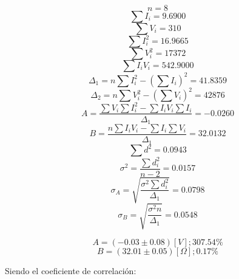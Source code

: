\documentclass[letter,11pt]{article}
\begin{document}
\begin{equation*}
    n = 8
\end{equation*}
\begin{equation*}
    \sum I_i = 9.6900
\end{equation*}
\begin{equation*}
    \sum V_i = 310
\end{equation*}
\begin{equation*}
    \sum I^2_i = 16.9665
\end{equation*}
\begin{equation*}
    \sum V^2_i = 17372
\end{equation*}
\begin{equation*}
    \sum I_i V_i = 542.9000
\end{equation*}
\begin{equation*}
    \Delta_1 = n \sum I^2_i - \left( \sum I_i \right)^2 = 41.8359
\end{equation*}
\begin{equation*}
    \Delta_2 = n \sum V^2_i - \left( \sum V_i \right)^2 = 42876
\end{equation*}
\begin{equation*}
    A = \frac{\sum V_i \sum I^2_i - \sum I_i V_i \sum I_i}{\Delta_1} = -0.0260
\end{equation*}
\begin{equation*}
    B = \frac{n \sum I_i V_i - \sum I_i \sum V_i}{\Delta_1} = 32.0132
\end{equation*}
\begin{equation*}
    \sum d^2 = 0.0943
\end{equation*}
\begin{equation*}
    \sigma^2 = \frac{\sum d^2_i}{n-2} = 0.0157
\end{equation*}
\begin{equation*}
    \sigma_A = \sqrt{\frac{\sigma^2 \sum d^2_i}{\Delta_1}} = 0.0798
\end{equation*}
\begin{equation*}
    \sigma_B = \sqrt{\frac{\sigma^2 n}{\Delta_1}} = 0.0548
\end{equation*}

\begin{equation*}
    A = (-0.03 \pm 0.08)[V]; 307.54 \%
\end{equation*}
\begin{equation*}
    B = (32.01 \pm 0.05)[\Omega]; 0.17 \%
\end{equation*}

Siendo el coeficiente de correlación:
\end{document}
